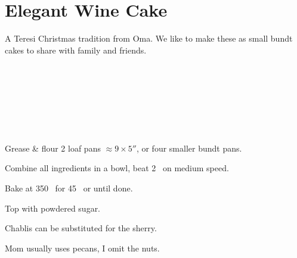 \section{Elegant Wine Cake}

\begin{recipestats}[
        servings=2 loafs,
        preptime=10 \minute,
        bakingtime=45 \minute,
        source=Lucille Steinmiller (Oma),
    ]
\end{recipestats}

\begin{recipeabstract}
    A Teresi Christmas tradition from Oma.
    We like to make these as small bundt cakes to share with family and friends.
\end{recipeabstract}

\begin{ingredientcolumns}[1]
    \begin{ingredientblock}
        \\
        \\
        \\
        \\
        \\
        \\
    \end{ingredientblock}
\end{ingredientcolumns}

\begin{preparation}
\item Grease \& flour 2 loaf pans $\approx 9 \times 5''$, or four smaller bundt pans.

\item Combine all ingredients in a bowl, beat 2 \minute~on medium speed.

\item Bake at 350 \Fahrenheit~for 45 \minute~or until done.

\item Top with powdered sugar.
\end{preparation}

\begin{variation}
\item Chablis can be substituted for the sherry.

\item Mom usually uses pecans, I  omit the nuts.
\end{variation}

\recipeend%
